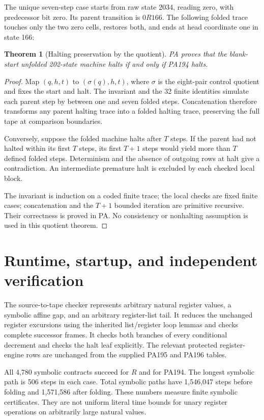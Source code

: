 \documentclass[11pt,letterpaper]{article}
\newtheorem{theorem}{Theorem}[section]
\begin{document}
The unique seven-step case starts from raw state 2034, reading zero,
with predecessor bit zero. Its parent transition is $0R166$. The
following folded trace touches only the two zero cells, restores both,
and ends at head coordinate one in state 166:


\begin{theorem}[Halting preservation by the quotient]
PA proves that the blank-start unfolded 202-state machine halts if
and only if PA194 halts.
\end{theorem}
\begin{proof}
Map $(q,h,t)$ to $(\sigma(q),h,t)$, where $\sigma$ is the eight-pair
control quotient and fixes the start and halt. The invariant and the
32 finite identities simulate each parent step by between one and
seven folded steps. Concatenation therefore transforms any parent
halting trace into a folded halting trace, preserving the full tape
at comparison boundaries.

Conversely, suppose the folded machine halts after $T$ steps. If the
parent had not halted within its first $T$ steps, its first $T+1$
steps would yield more than $T$ defined folded steps. Determinism and
the absence of outgoing rows at halt give a contradiction. An
intermediate premature halt is excluded by each checked local block.

The invariant is induction on a coded finite trace; the local checks
are fixed finite cases; concatenation and the $T+1$ bounded iteration
are primitive recursive. Their correctness is proved in PA. No
consistency or nonhalting assumption is used in this quotient theorem.
\end{proof}

\section{Runtime, startup, and independent verification}
\label{sec:verification}
The source-to-tape checker represents arbitrary natural register
values, a symbolic affine gap, and an arbitrary register-list tail.
It reduces the unchanged register excursions using the inherited
list/register loop lemmas and checks complete successor frames. It
checks both branches of every conditional decrement and checks the
halt leaf explicitly. The relevant protected register-engine rows are
unchanged from the supplied PA195 and PA196 tables.

All 4,780 symbolic contracts succeed for $R$ and for PA194. The longest
symbolic path is 506 steps in each case. Total symbolic paths have
1,546,047 steps before folding and 1,571,586 after folding. These
numbers measure finite symbolic certificates. They are not uniform
literal time bounds for unary register operations on arbitrarily
large natural values.
\end{document}
